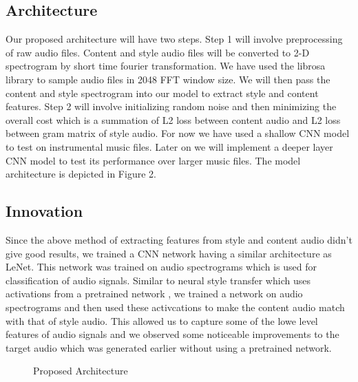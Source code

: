 \documentclass[10pt,twocolumn,letterpaper]{article}
\begin{document}
\subsection{Architecture}
Our proposed architecture will have two steps. Step 1 will involve preprocessing of raw audio files. Content and style audio files will be converted to 2-D spectrogram by short time fourier transformation. We have used the librosa library to sample audio files in 2048 FFT window size.
We will then pass the content and style spectrogram into our model to extract style and content features. Step 2 will involve initializing random noise and then minimizing the overall cost which is a summation of L2 loss between content audio and L2 loss between gram matrix of style audio. For now we have used a shallow CNN model to test on instrumental music files. Later on we will implement a deeper layer CNN model to test its performance over larger music files. The model architecture is depicted in Figure 2.

\subsection{Innovation}
Since the above method of extracting features from style and content audio didn't give good results, we trained a CNN network having a similar architecture as LeNet. This network was trained on audio spectrograms which is used for classification of audio signals. Similar to neural style transfer which uses activations from a pretrained network , we trained a network on audio spectrograms and then used these activcations to make the content audio match with that of style audio. This allowed us to capture some of the lowe level features of audio signals and we observed some noticeable improvements to the target audio which was generated earlier without using a pretrained network.



\begin{figure}
\begin{center}
\end{center}
   \caption{Proposed Architecture}
\label{fig:short}
\end{figure}
\end{document}
